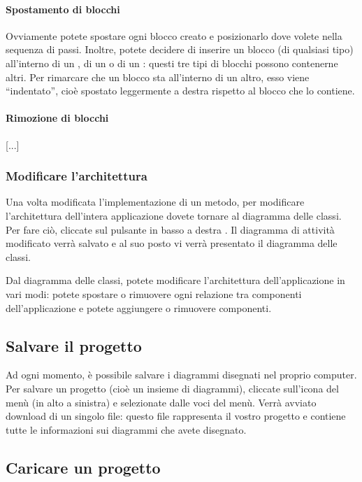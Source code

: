 \paragraph{Spostamento di blocchi} Ovviamente potete spostare ogni blocco creato e posizionarlo dove volete nella sequenza di passi. Inoltre, potete decidere di inserire un blocco (di qualsiasi tipo) all'interno di un , di un  o di un : questi tre tipi di blocchi possono contenerne altri. Per rimarcare che un blocco sta all'interno di un altro, esso viene “indentato”, cioè spostato leggermente a destra rispetto al blocco che lo contiene.

\paragraph{Rimozione di blocchi} [...] %

\subsubsection{Modificare l'architettura}
Una volta modificata l'implementazione di un metodo, per modificare l'architettura dell'intera applicazione dovete tornare al diagramma delle classi. Per fare ciò, cliccate sul pulsante in basso a destra . Il diagramma di attività modificato verrà salvato e al suo posto vi verrà presentato il diagramma delle classi.

Dal diagramma delle classi, potete modificare l'architettura dell'applicazione in vari modi: potete spostare o rimuovere ogni relazione tra componenti dell'applicazione e potete aggiungere o rimuovere componenti.



\subsection{Salvare il progetto} \label{sec:save} %

Ad ogni momento, è possibile salvare i diagrammi disegnati nel proprio computer. Per salvare un progetto (cioè un insieme di diagrammi), cliccate sull'icona del menù (in alto a sinistra) e selezionate  dalle voci del menù. Verrà avviato download di un singolo file: questo file rappresenta il vostro progetto e contiene tutte le informazioni sui diagrammi che avete disegnato.



\subsection{Caricare un progetto} \label{sec:load}


